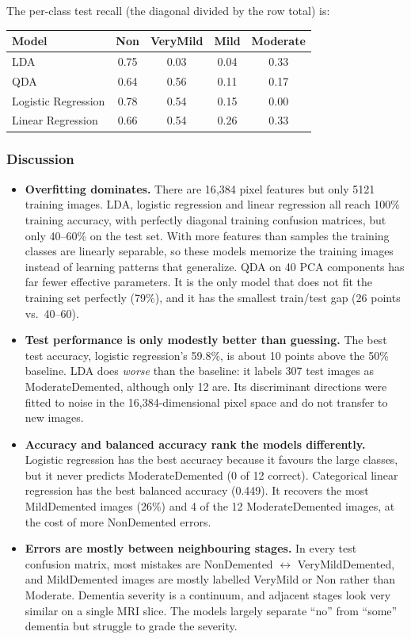 \documentclass[11pt]{article}
\begin{document}
The per-class test recall (the diagonal divided by the row total) is:

\begin{center}
\begin{tabular}{lcccc}
\toprule
Model & Non & VeryMild & Mild & Moderate \\
\midrule
LDA                 & 0.75 & 0.03 & 0.04 & 0.33 \\
QDA                 & 0.64 & 0.56 & 0.11 & 0.17 \\
Logistic Regression & 0.78 & 0.54 & 0.15 & 0.00 \\
Linear Regression   & 0.66 & 0.54 & 0.26 & 0.33 \\
\bottomrule
\end{tabular}
\end{center}

\subsubsection*{Discussion}

\begin{itemize}
  \item \textbf{Overfitting dominates.} There are 16{,}384 pixel features but only 5121
  training images. LDA, logistic regression and linear regression all reach 100\% training
  accuracy, with perfectly diagonal training confusion matrices, but only 40--60\% on the test
  set. With more features than samples the training classes are linearly separable, so these
  models memorize the training images instead of learning patterns that generalize. QDA on 40
  PCA components has far fewer effective parameters. It is the only model that does not fit
  the training set perfectly (79\%), and it has the smallest train/test gap (26 points vs.\
  40--60).
  \item \textbf{Test performance is only modestly better than guessing.} The best test
  accuracy, logistic regression's 59.8\%, is about 10 points above the 50\% baseline. LDA does
  \emph{worse} than the baseline: it labels 307 test images as ModerateDemented, although
  only 12 are. Its discriminant directions were fitted to noise in the 16{,}384-dimensional
  pixel space and do not transfer to new images.
  \item \textbf{Accuracy and balanced accuracy rank the models differently.} Logistic
  regression has the best accuracy because it favours the large classes, but it never
  predicts ModerateDemented (0 of 12 correct). Categorical linear regression has the best
  balanced accuracy (0.449). It recovers the most MildDemented images (26\%) and 4 of the 12
  ModerateDemented images, at the cost of more NonDemented errors.
  \item \textbf{Errors are mostly between neighbouring stages.} In every test confusion
  matrix, most mistakes are NonDemented $\leftrightarrow$ VeryMildDemented, and MildDemented
  images are mostly labelled VeryMild or Non rather than Moderate. Dementia severity is a
  continuum, and adjacent stages look very similar on a single MRI slice. The models largely
  separate ``no'' from ``some'' dementia but struggle to grade the severity.
\end{itemize}
\end{document}
